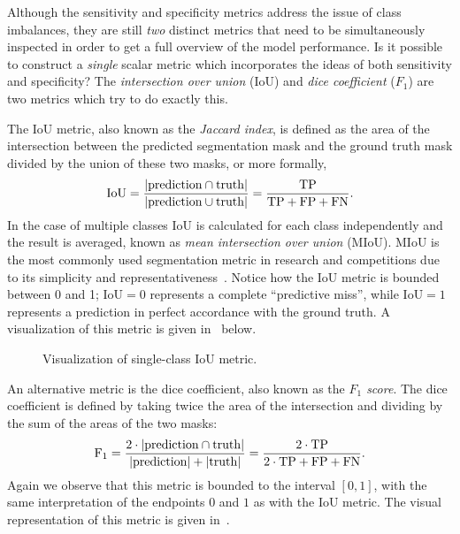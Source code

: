Although the sensitivity and specificity metrics address the issue of class imbalances, they are still \textit{two} distinct metrics that need to be simultaneously inspected in order to get a full overview of the model performance.
Is it possible to construct a \textit{single} scalar metric which incorporates the ideas of both sensitivity and specificity?
The \textit{intersection over union} (IoU) and \textit{dice coefficient} ($F_1$) are two metrics which try to do exactly this.

The IoU metric, also known as the \textit{Jaccard index}, is defined as the area of the intersection between the predicted segmentation mask and the ground truth mask divided by the union of these two masks, or more formally,
%
\begin{equation*}
  \mathrm{IoU}
  =
  \frac{%
    |\mathrm{prediction} \cap \mathrm{truth}|
  }{%
    |\mathrm{prediction} \cup \mathrm{truth}|
  }
  =
  \frac{%
    \mathrm{TP}
  }{%
    \mathrm{TP} + \mathrm{FP} + \mathrm{FN}
  }.
\end{equation*}
%
In the case of multiple classes IoU is calculated for each class independently and the result is averaged, known as \textit{mean intersection over union} (MIoU).
MIoU is the most commonly used segmentation metric in research and competitions due to its simplicity and representativeness~\cite{segmentation-overview}.
Notice how the IoU metric is bounded between 0 and 1; $\mathrm{IoU} = 0$ represents a complete \enquote{predictive miss}, while $\mathrm{IoU} = 1$ represents a prediction in perfect accordance with the ground truth.
A visualization of this metric is given in~ below.

\begin{figure}[H]
  \centering
  
  \caption{%
    Visualization of single-class IoU metric.
  }%
  \label{fig:iou-metric}
\end{figure}

An alternative metric is the dice coefficient, also known as the \textit{$F_1$ score}.
The dice coefficient is defined by taking twice the area of the intersection and dividing by the sum of the areas of the two masks:
%
\begin{equation*}
  \mathrm{F_1}
  =
  \frac{%
    2 \cdot |\mathrm{prediction} \cap \mathrm{truth}|
  }{%
    |\mathrm{prediction}| + |\mathrm{truth}|
  }
  =
  \frac{%
    \mathrm{2 \cdot TP}
  }{%
    2 \cdot \mathrm{TP} + \mathrm{FP} + \mathrm{FN}
  }.
\end{equation*}
%
Again we observe that this metric is bounded to the interval $[0, 1]$, with the same interpretation of the endpoints $0$ and $1$ as with the IoU metric.
The visual representation of this metric is given in~.


